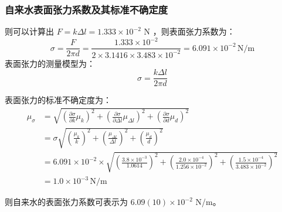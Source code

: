 \documentclass[a4paper]{extarticle}
\begin{document}
    \subsubsection{自来水表面张力系数及其标准不确定度}
    \hspace{2em}
    则可以计算出 $F=k\Delta l=1.333\times10^{-2}$ N ，则表面张力系数为：
    \begin{equation*}
        \sigma=\frac{F}{2\pi d}=\frac{1.333\times10^{-2}}{2\times 3.1416 \times3.483\times10^{-2}}=6.091\times10^{-2} \,\text{N/m}    
    \end{equation*}
    \hspace{2em}
    表面张力的测量模型为：
    \begin{equation*}
        \sigma=\frac{k\Delta l}{2\pi d}
    \end{equation*}
    \par\hspace{2em}
    表面张力的标准不确定度为：
    \begin{equation*}
        \begin{aligned}
            \mu_{\sigma} &= \sqrt{\left(\frac{\partial \sigma}{\partial k}\mu_k\right)^2+\left(\frac{\partial \sigma}{\partial \Delta l}\mu_{\Delta l}\right)^2+\left(\frac{\partial \sigma}{\partial d}\mu_d\right)^2}\\
            &=\sigma \sqrt{\left(\frac{\mu_k}{k}\right)^2+\left(\frac{\mu_{\Delta l}}{\Delta l}\right)^2+\left(\frac{\mu_d}{d}\right)^2}\\
            &=6.091\times10^{-2}\times\sqrt{\left(\frac{3.8\times10^{-3}}{1.0614}\right)^2+\left(\frac{2.0\times10^{-4}}{1.256\times10^{-2}}\right)^2+\left(\frac{1.5\times10^{-4}}{3.483\times10^{-2}}\right)^2}\\
            &=1.0\times10^{-3}\,\text{N/m}
        \end{aligned}
    \end{equation*}
    \par\hspace{2em}
    则自来水的表面张力系数可表示为 $6.09(10)\times10^{-2}$ N/m。
\end{document}

